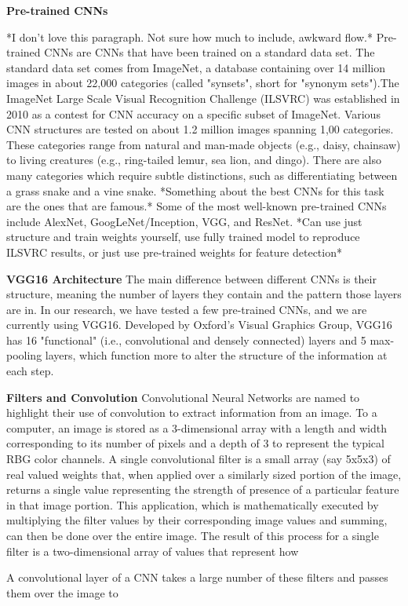 \documentclass{article}\usepackage[]{graphicx}\usepackage[]{color}
\begin{document}
\textbf{Pre-trained CNNs}


*I don't love this paragraph. Not sure how much to include, awkward flow.*
Pre-trained CNNs are CNNs that have been trained on a standard data set. The standard data set comes from ImageNet, a database containing over 14 million images in about 22,000 categories (called "synsets", short for "synonym sets").The ImageNet Large Scale Visual Recognition Challenge (ILSVRC) was established in 2010 as a contest for CNN accuracy on a specific subset of ImageNet. Various CNN structures are tested on about 1.2 million images spanning 1,00 categories. These categories range from natural and man-made objects (e.g., daisy, chainsaw) to living creatures (e.g., ring-tailed lemur, sea lion, and dingo). There are also many categories which require subtle distinctions, such as differentiating between a grass snake and a vine snake. *Something about the best CNNs for this task are the ones that are famous.* Some of the most well-known pre-trained CNNs include AlexNet, GoogLeNet/Inception, VGG, and ResNet. *Can use just structure and train weights yourself, use fully trained model to reproduce ILSVRC results, or just use pre-trained weights for feature detection*

\textbf{VGG16 Architecture}
The main difference between different CNNs is their structure, meaning the number of layers they contain and the pattern those layers are in. In our research, we have tested a few pre-trained CNNs, and we are currently using VGG16. Developed by Oxford's Visual Graphics Group, VGG16 has 16 "functional" (i.e., convolutional and densely connected) layers and 5 max-pooling layers, which function more to alter the structure of the information at each step.

\textbf{Filters and Convolution}
Convolutional Neural Networks are named to highlight their use of convolution to extract information from an image. To a computer, an image is stored as a 3-dimensional array with a length and width corresponding to its number of pixels and a depth of 3 to represent the typical RBG color channels. A single convolutional filter is a small array (say 5x5x3) of real valued weights that, when applied over a similarly sized portion of the image, returns a single value representing the strength of presence of a particular feature in that image portion. This application, which is mathematically executed by multiplying the filter values by their corresponding image values and summing, can then be done over the entire image. The result of this process for a single filter is a two-dimensional array of values that represent how


A convolutional layer of a CNN takes a large number of these filters and passes them over the image to 
\end{document}
